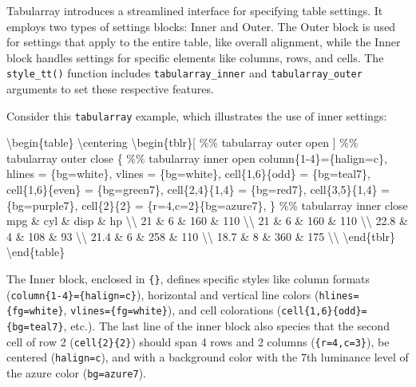\documentclass[
  letterpaper,
  DIV=11,
  numbers=noendperiod]{scrartcl}
\newenvironment{Shaded}{\begin{snugshade}}{\end{snugshade}}
\newcommand{\CommentTok}[1]{\textcolor[rgb]{0.37,0.37,0.37}{#1}}
\newcommand{\ExtensionTok}[1]{\textcolor[rgb]{0.00,0.23,0.31}{#1}}
\newcommand{\FunctionTok}[1]{\textcolor[rgb]{0.28,0.35,0.67}{#1}}
\newcommand{\KeywordTok}[1]{\textcolor[rgb]{0.00,0.23,0.31}{#1}}
\newcommand{\NormalTok}[1]{\textcolor[rgb]{0.00,0.23,0.31}{#1}}
\begin{document}
Tabularray introduces a streamlined interface for specifying table
settings. It employs two types of settings blocks: Inner and Outer. The
Outer block is used for settings that apply to the entire table, like
overall alignment, while the Inner block handles settings for specific
elements like columns, rows, and cells. The \texttt{style\_tt()}
function includes \texttt{tabularray\_inner} and
\texttt{tabularray\_outer} arguments to set these respective features.

Consider this \texttt{tabularray} example, which illustrates the use of
inner settings:

\begin{Shaded}
\begin{Highlighting}[]
\KeywordTok{\textbackslash{}begin}\NormalTok{\{}\ExtensionTok{table}\NormalTok{\}}
\FunctionTok{\textbackslash{}centering}
\KeywordTok{\textbackslash{}begin}\NormalTok{\{}\ExtensionTok{tblr}\NormalTok{\}[         }\CommentTok{\%\% tabularray outer open}
\NormalTok{]                     }\CommentTok{\%\% tabularray outer close}
\NormalTok{\{                     }\CommentTok{\%\% tabularray inner open}
\NormalTok{column\{1{-}4\}=\{halign=c\},}
\NormalTok{hlines = \{bg=white\},}
\NormalTok{vlines = \{bg=white\},}
\NormalTok{cell\{1,6\}\{odd\} = \{bg=teal7\},}
\NormalTok{cell\{1,6\}\{even\} = \{bg=green7\},}
\NormalTok{cell\{2,4\}\{1,4\} = \{bg=red7\},}
\NormalTok{cell\{3,5\}\{1,4\} = \{bg=purple7\},}
\NormalTok{cell\{2\}\{2\} = \{r=4,c=2\}\{bg=azure7\},}
\NormalTok{\}                     }\CommentTok{\%\% tabularray inner close}
\NormalTok{mpg \& cyl \& disp \& hp }\FunctionTok{\textbackslash{}\textbackslash{}}
\NormalTok{21 \& 6 \& 160 \& 110 }\FunctionTok{\textbackslash{}\textbackslash{}}
\NormalTok{21 \& 6 \& 160 \& 110 }\FunctionTok{\textbackslash{}\textbackslash{}}
\NormalTok{22.8 \& 4 \& 108 \& 93 }\FunctionTok{\textbackslash{}\textbackslash{}}
\NormalTok{21.4 \& 6 \& 258 \& 110 }\FunctionTok{\textbackslash{}\textbackslash{}}
\NormalTok{18.7 \& 8 \& 360 \& 175 }\FunctionTok{\textbackslash{}\textbackslash{}}
\KeywordTok{\textbackslash{}end}\NormalTok{\{}\ExtensionTok{tblr}\NormalTok{\}}
\KeywordTok{\textbackslash{}end}\NormalTok{\{}\ExtensionTok{table}\NormalTok{\}}
\end{Highlighting}
\end{Shaded}

The Inner block, enclosed in \texttt{\{\}}, defines specific styles like
column formats (\texttt{column\{1-4\}=\{halign=c\}}), horizontal and
vertical line colors (\texttt{hlines=\{fg=white\}},
\texttt{vlines=\{fg=white\}}), and cell colorations
(\texttt{cell\{1,6\}\{odd\}=\{bg=teal7\}}, etc.). The last line of the
inner block also species that the second cell of row 2
(\texttt{cell\{2\}\{2\}}) should span 4 rows and 2 columns
(\texttt{\{r=4,c=3\}}), be centered (\texttt{halign=c}), and with a
background color with the 7th luminance level of the azure color
(\texttt{bg=azure7}).
\end{document}
